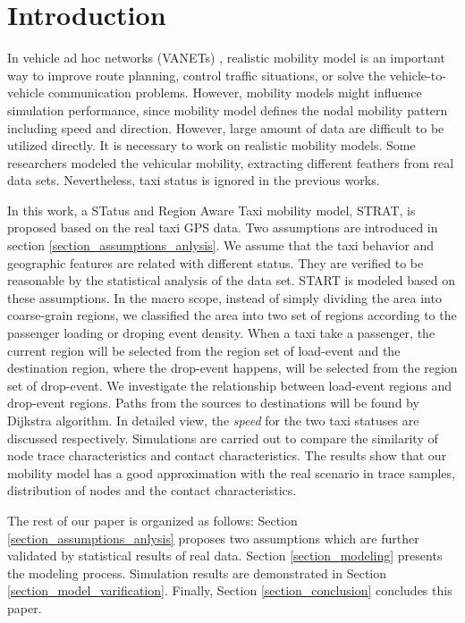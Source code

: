 \section{Introduction}
\label{section_introduction}

In vehicle ad hoc networks (VANETs) \cite{4068700}, realistic mobility model is an important way to improve route planning, control traffic situations, or solve the vehicle-to-vehicle communication problems. However, mobility models might influence simulation performance, since mobility model defines the nodal mobility pattern including speed and direction. However, large amount of data are difficult to be utilized directly. It is necessary to work on realistic mobility models. Some researchers \cite{KimKotz-99,HuangZhu-88} modeled the vehicular mobility, extracting different feathers from real data sets. Nevertheless, taxi status is ignored in the previous works.

In this work, a STatus and Region Aware Taxi mobility model, STRAT, is proposed based on the real taxi GPS data. Two assumptions are introduced in section \ref{section_assumptions_anlysis}. We assume that the taxi behavior and geographic features are related with different status. They are verified to be reasonable by the statistical analysis of the data set.
START is modeled based on these assumptions. In the macro scope, instead of simply dividing the area into coarse-grain regions, we classified the area into two set of regions according to the passenger loading or droping event density. When a taxi take a passenger, the current region will be selected from the region set of load-event and the destination region, where the drop-event happens, will be selected from the region set of drop-event. We investigate the relationship between load-event regions and drop-event regions. Paths from the sources to destinations will be found by Dijkstra algorithm. In detailed view, the \emph{speed} for the two taxi statuses are discussed respectively.
Simulations are carried out to compare the similarity of node trace characteristics and contact characteristics. The results show that our mobility model has a good approximation with the real scenario in trace samples, distribution of nodes and the contact characteristics.

The rest of our paper is organized as follows: %
 Section \ref{section_assumptions_anlysis} proposes two assumptions which are further validated by statistical results of real data. Section \ref{section_modeling} presents the modeling process. Simulation results are demonstrated in Section \ref{section_model_varification}. Finally, Section \ref{section_conclusion} concludes this paper.


